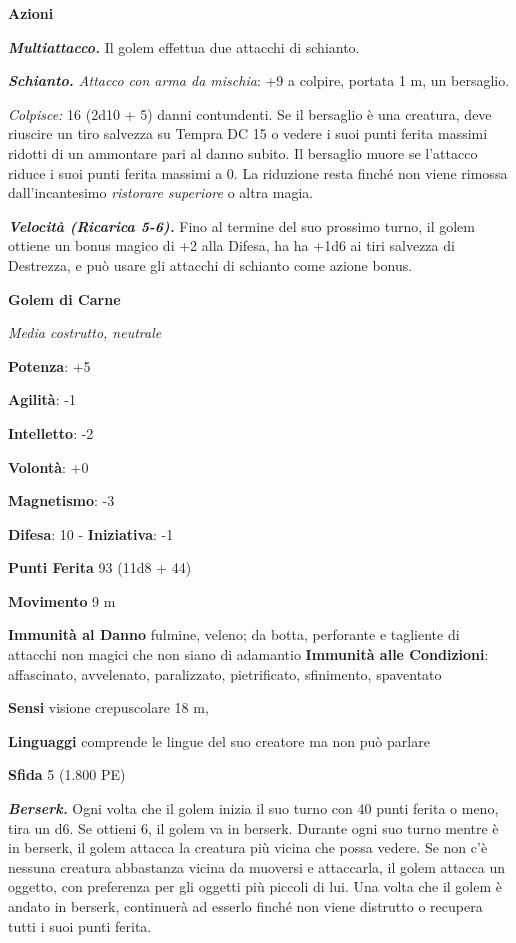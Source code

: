 \begin{multicols}{2}
\smallskip\textbf{Azioni}

\emph{\textbf{Multiattacco.}} Il golem effettua due attacchi di
schianto.

\emph{\textbf{Schianto.} Attacco con arma da mischia}: +9 a colpire,
portata 1 m, un bersaglio.

\emph{Colpisce:} 16 (2d10 + 5) danni contundenti. Se il bersaglio è una
creatura, deve riuscire un tiro salvezza su Tempra DC 15 o vedere
i suoi punti ferita massimi ridotti di un ammontare pari al danno
subito. Il bersaglio muore se l'attacco riduce i suoi punti ferita
massimi a 0. La riduzione resta finché non viene rimossa
dall'incantesimo \emph{ristorare superiore} o altra magia.

\emph{\textbf{Velocità (Ricarica 5-6).}} Fino al termine del suo
prossimo turno, il golem ottiene un bonus magico di +2 alla Difesa, ha
ha +1d6 ai tiri salvezza di Destrezza, e può usare gli attacchi di
schianto come azione bonus.

\textbf{Golem di Carne}

\emph{Media costrutto, neutrale}

\textbf{Potenza}: +5

\textbf{Agilità}: -1

\textbf{Intelletto}: -2

\textbf{Volontà}: +0

\textbf{Magnetismo}: -3

\textbf{Difesa}: 10 - \textbf{Iniziativa}: -1

\textbf{Punti Ferita} 93 (11d8 + 44)

\textbf{Movimento} 9 m

\textbf{Immunità al Danno} fulmine, veleno; da botta, perforante e
tagliente di attacchi non magici che non siano di adamantio
\textbf{Immunità alle Condizioni}: affascinato, avvelenato, paralizzato,
pietrificato, sfinimento, spaventato

\textbf{Sensi} visione crepuscolare 18 m, 

\textbf{Linguaggi} comprende le lingue del suo creatore ma non può
parlare

\textbf{Sfida} 5 (1.800 PE)\smallskip

\emph{\textbf{Berserk.}} Ogni volta che il golem inizia il suo turno con
40 punti ferita o meno, tira un d6. Se ottieni 6, il golem va in
berserk. Durante ogni suo turno mentre è in berserk, il golem attacca la
creatura più vicina che possa vedere. Se non c'è nessuna creatura
abbastanza vicina da muoversi e attaccarla, il golem attacca un oggetto,
con preferenza per gli oggetti più piccoli di lui. Una volta che il
golem è andato in berserk, continuerà ad esserlo finché non viene
distrutto o recupera tutti i suoi punti ferita.


\end{multicols}
